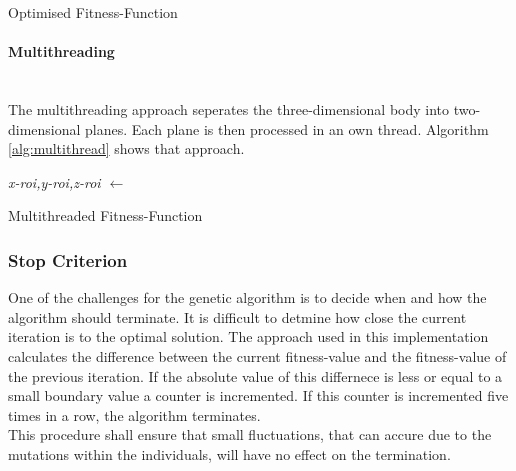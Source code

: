 \documentclass[12pt]{article}
\begin{document}
\begin{algorithm}[H]
\label{alg:scalefif}

\caption{Optimised Fitness-Function}
\end{algorithm} 






\paragraph{Multithreading}
\label{para:multithreading}
~\\ 
The multithreading approach seperates the 
three-dimensional
body into two-dimensional planes. Each plane is then
processed in an own thread. Algorithm \ref{alg:multithread} shows that approach.\\

 \begin{algorithm}[H]
 \label{alg:multithread}

 \emph{x-roi,y-roi,z-roi $\leftarrow$}   \;
 \caption{Multithreaded Fitness-Function}
 \end{algorithm} 

\subsubsection{Stop Criterion}
\label{subsubsec: stopcrit}
One of the challenges for the genetic algorithm is to decide when and how the algorithm should terminate. It is difficult to detmine how close the current iteration is to the optimal solution. The approach used in this implementation calculates the difference between the current fitness-value and the fitness-value of the previous iteration. If the absolute value of this differnece is less or equal to a small boundary value a counter is incremented. If this counter is incremented five times in a row, the algorithm terminates. \\ 
This procedure shall ensure that small fluctuations, that can accure due to the mutations within the individuals, will have no effect on the termination. \\
\end{document}
